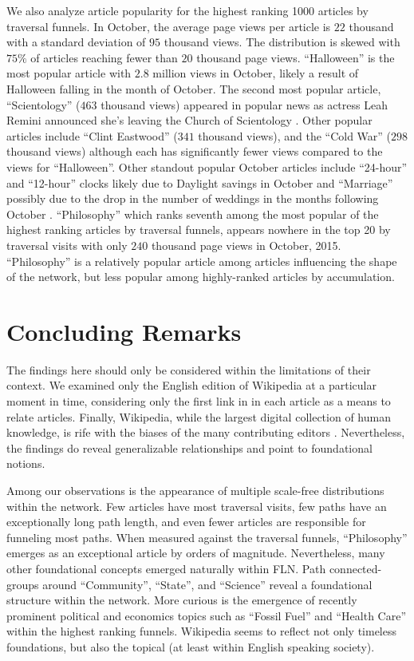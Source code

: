 \documentclass[pre,twocolumn,twoside,superscriptaddress,floatfix]{revtex4-1}
\begin{document}
{We also analyze article popularity for the highest ranking 1000 articles by 
traversal funnels. In October, the average page views per article is 
$22$ thousand with a standard deviation of $95$ thousand views. The distribution
is skewed with $75\%$ of articles reaching fewer than $20$ thousand page views. 
``Halloween'' is the most popular article with $2.8$ million views in October,
likely a result of Halloween falling in the month of October. 
The second most popular article, ``Scientology'' ($463$ thousand views) appeared in popular news as actress Leah Remini announced she's leaving the Church of Scientology 
\cite{scientology}.
Other popular articles include ``Clint Eastwood'' ($341$ thousand views),
and the ``Cold War'' ($298$ thousand views) although each has significantly fewer views compared to the views for ``Halloween''.
Other standout popular October articles include ``24-hour'' and ``12-hour'' clocks likely due
to Daylight savings in October and ``Marriage'' possibly due to the drop in the number of
weddings in the months following October
\cite{weddings}.
``Philosophy'' which ranks seventh among the most popular of the highest ranking articles by traversal funnels, appears nowhere in the top 20
by traversal visits with only $240$ thousand page views in October, 2015. ``Philosophy'' is a relatively popular article 
among articles influencing the shape of the network, but less popular among 
highly-ranked articles by accumulation.


\section{Concluding Remarks}

The findings here should only be considered within the limitations of their context.
We examined only the English edition of Wikipedia at a particular moment in time, 
considering only the first link in in each article as a means to relate articles.
Finally, Wikipedia, while the largest digital 
collection of human knowledge, is rife with the biases of the many contributing editors
\cite{wagner2015s}.
Nevertheless, the findings do reveal
generalizable relationships and point to foundational notions.

Among our observations is the appearance of multiple scale-free distributions within the network. 
Few articles have most traversal visits, few paths have an exceptionally long path length, and even fewer
articles are responsible for funneling most paths. When measured against the traversal funnels, 
``Philosophy'' emerges as an exceptional article by orders of magnitude. 
Nevertheless, many other foundational concepts emerged naturally within FLN. 
Path connected-groups around ``Community'', ``State'', and ``Science'' reveal a foundational structure within the network. 
More curious is the emergence of recently prominent political and economics topics such as ``Fossil Fuel'' and ``Health Care'' 
within the highest ranking funnels. 
Wikipedia seems to reflect not only timeless foundations, but also the topical (at least within English speaking society).

}
\end{document}
